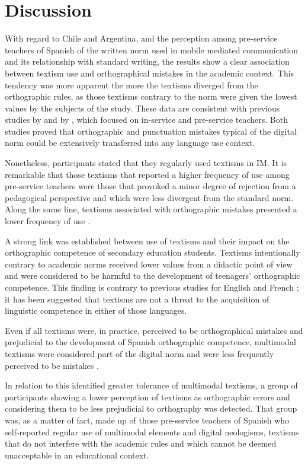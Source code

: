 \documentclass{textolivre}
\begin{document}
\section{Discussion}
With regard to Chile and Argentina, and the perception among pre-service teachers of Spanish of the written norm used in mobile mediated communication and its relationship with standard writing, the results show a clear association between textism use and orthographical mistakes in the academic context. This tendency was more apparent the more the textisms diverged from the orthographic rules, as those textisms contrary to the norm were given the lowest values by the subjects of the study. These data are consistent with previous studies by \textcite{Gomez-Camacho2018} and by \textcite{Cremades2019b}, which focused on in-service and pre-service teachers. Both studies proved that orthographic and punctuation mistakes typical of the digital norm could be extensively transferred into any language use context. 

Nonetheless, participants stated that they regularly used textisms in IM. It is remarkable that those textisms that reported a higher frequency of use among pre-service teachers were those that provoked a minor degree of rejection from a pedagogical perspective and which were less divergent from the standard norm. Along the same line, textisms associated with orthographic mistakes presented a lower frequency of use \cite{Gomez-Camacho2016, Gomez-Camacho2018}.

A strong link was established between use of textisms and their impact on the orthographic competence of secondary education students. Textisms intentionally contrary to academic norms received lower values from a didactic point of view and were considered to be harmful to the development of teenagers’ orthographic competence. This finding is contrary to previous studies for English \cite{Kemp2011} and French \cite{Bernicot2014, Cougnon2017}; it has been suggested that textisms are not a threat to the acquisition of linguistic competence in either of those languages.

Even if all textisms were, in practice, perceived to be orthographical mistakes and prejudicial to the development of Spanish orthographic competence, multimodal textisms were considered part of the digital norm and were less frequently perceived to be mistakes \cite{Gomez-Camacho2018}. 

In relation to this identified greater tolerance of multimodal textisms, a group of participants showing a lower perception of textisms as orthographic errors and considering them to be less prejudicial to orthography was detected. That group was, as a matter of fact, made up of those pre-service teachers of Spanish who self-reported regular use of multimodal elements and digital neologisms, textisms that do not interfere with the academic rules and which cannot be deemed unacceptable in an educational context. 
\end{document}

